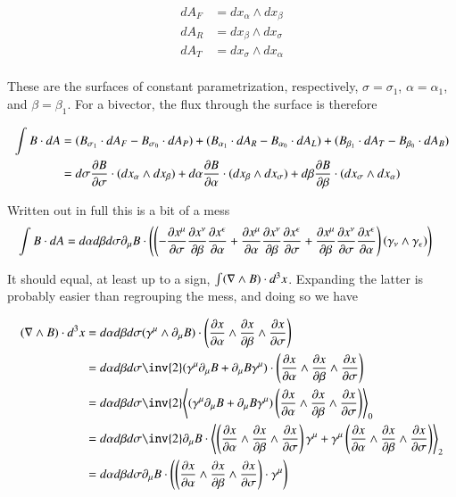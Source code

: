 \begin{align*}
dA_F &= dx_\alpha \wedge dx_\beta \\
dA_R &= dx_\beta \wedge dx_\sigma \\
dA_T &= dx_\sigma \wedge dx_\alpha \\
\end{align*}

These are the surfaces of constant parametrization, respectively, $\sigma = \sigma_1$, $\alpha = \alpha_1$, and $\beta = \beta_1$.  For a bivector, the flux through the surface is therefore

\begin{align*}
\int B \cdot dA 
&=
(B_{\sigma_1} \cdot dA_F - B_{\sigma_0} \cdot dA_P )
+ (B_{\alpha_1} \cdot dA_R - B_{\alpha_0} \cdot dA_L)
+ (B_{\beta_1} \cdot dA_T - B_{\beta_0} \cdot dA_B) \\
&=
d \sigma \frac{\partial {B}}{\partial {\sigma}} \cdot (dx_\alpha \wedge dx_\beta )
+ d \alpha \frac{\partial {B}}{\partial {\alpha}} \cdot (dx_\beta \wedge dx_\sigma) 
+ d \beta \frac{\partial {B}}{\partial {\beta}} \cdot (dx_\sigma \wedge dx_\alpha ) \\
\end{align*}

Written out in full this is a bit of a mess
\begin{align}\label{eqn:stokesGradeTwo:mess}
\int B \cdot dA 
&=
d \alpha d\beta d\sigma 
\partial_\mu B \cdot
\left(
\left(
- \frac{\partial {x^\mu}}{\partial {\sigma}} \frac{\partial {x^\nu}}{\partial {\beta}} \frac{\partial {x^\epsilon}}{\partial {\alpha}} 
+ \frac{\partial {x^\mu}}{\partial {\alpha}} \frac{\partial {x^\nu}}{\partial {\beta}} \frac{\partial {x^\epsilon}}{\partial {\sigma}} 
+ \frac{\partial {x^\mu}}{\partial {\beta}} \frac{\partial {x^\nu}}{\partial {\sigma}} \frac{\partial {x^\epsilon}}{\partial {\alpha}} 
\right) 
(\gamma_\nu \wedge \gamma_\epsilon )
\right) 
\end{align}

It should equal, at least up to a sign, $\int (\nabla \wedge B) \cdot d^3 x$.  Expanding the latter is probably easier than regrouping the mess, and doing so we have

\begin{align*}
(\grad \wedge B) \cdot d^3 x
&=
d\alpha d\beta d\sigma ( \gamma^\mu \wedge \partial_\mu B)  \cdot \left( \PD{\alpha}{x} \wedge \PD{\beta}{x} \wedge \PD{\sigma}{x} \right) \\
&= 
d\alpha d\beta d\sigma \inv{2} ( \gamma^\mu \partial_\mu B + \partial_\mu B \gamma^\mu )  \cdot \left( \PD{\alpha}{x} \wedge \PD{\beta}{x} \wedge \PD{\sigma}{x} \right) \\
&=
d\alpha d\beta d\sigma \inv{2} \gpgradezero{
( \gamma^\mu \partial_\mu B + \partial_\mu B \gamma^\mu )  \left( \PD{\alpha}{x} \wedge \PD{\beta}{x} \wedge \PD{\sigma}{x} \right) }
\\
&=
d\alpha d\beta d\sigma \inv{2} 
\partial_\mu B \cdot
\gpgradetwo{
\left( \PD{\alpha}{x} \wedge \PD{\beta}{x} \wedge \PD{\sigma}{x} \right) \gamma^\mu 
+ \gamma^\mu \left( \PD{\alpha}{x} \wedge \PD{\beta}{x} \wedge \PD{\sigma}{x} \right) }
\\
&=
d\alpha d\beta d\sigma 
\partial_\mu B \cdot
\left( \left( \PD{\alpha}{x} \wedge \PD{\beta}{x} \wedge \PD{\sigma}{x} \right) \cdot \gamma^\mu \right)
\\
\end{align*}

